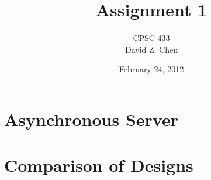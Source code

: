 \documentclass[letterpaper,12pt]{article}
\begin{document}
\title{Assignment 1}
\date{February 24, 2012}
\author{CPSC 433 \\ David Z. Chen}

\maketitle

\section{Asynchronous Server}

\section{Comparison of Designs}
\end{document}
